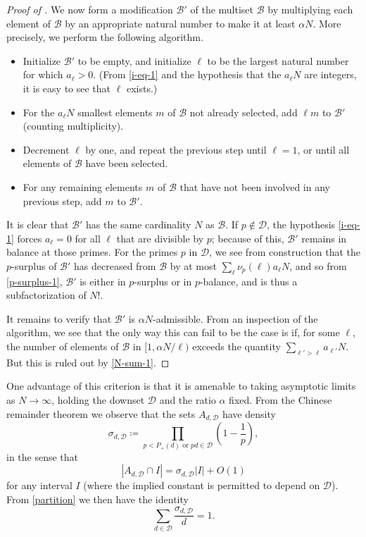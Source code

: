 \documentclass[10pt,a4paper,reqno]{amsart}
\numberwithin{equation}{section}
\theoremstyle{plain}
\theoremstyle{definition}
\newcommand\tuple{{\mathcal B}}
\begin{document}
\begin{proof}[Proof of ]
  We now form a modification $\tuple'$ of the multiset $\tuple$ by multiplying each element of $\tuple$ by an appropriate natural number to make it at least $\alpha N$.  More precisely, we perform the following algorithm.
  \begin{itemize}
    \item Initialize $\tuple'$ to be empty, and initialize $\ell$ to be the largest natural number for which $a_\ell > 0$.  (From \eqref{i-eq-1} and the hypothesis that the $a_\ell N$ are integers, it is easy to see that $\ell$ exists.)
    \item For the $a_\ell N$ smallest elements $m$ of $\tuple$ not already selected, add $\ell m$ to $\tuple'$ (counting multiplicity).
    \item Decrement $\ell$ by one, and repeat the previous step until $\ell=1$, or until all elements of $\tuple$ have been selected.
    \item For any remaining elements $m$ of $\tuple$ that have not been involved in any previous step, add $m$ to $\tuple'$.
  \end{itemize}
  It is clear that $\tuple'$ has the same cardinality $N$ as $\tuple$.  If $p \not \in {\mathcal D}$, the hypothesis \eqref{i-eq-1} forces $a_\ell=0$ for all $\ell$ that are divisible by $p$; because of this, $\tuple'$ remains in balance at those primes.  For the primes $p$ in ${\mathcal D}$, we see from construction that the $p$-surplus of $\tuple'$ has decreased from $\tuple$ by at most
  $\sum_\ell \nu_p(\ell) a_\ell N$, and so from \eqref{p-surplus-1}, $\tuple'$ is either in $p$-surplus or in $p$-balance, and is thus a subfactorization of $N!$.

It remains to verify that $\tuple'$ is $\alpha N$-admissible.  From an inspection of the algorithm, we see that the only way this can fail to be the case is if, for some $\ell$, the number of elements of $\tuple$ in $[1, \alpha N/\ell)$ exceeds the quantity $\sum_{\ell' > \ell} a_{\ell'} N$.  But this is ruled out by \eqref{N-sum-1}.
\end{proof}

One advantage of this criterion is that it is amenable to taking asymptotic limits as $N \to \infty$, holding the downset ${\mathcal D}$ and the ratio $\alpha$ fixed.  From the Chinese remainder theorem we observe that the sets $A_{d,{\mathcal D}}$ have density
$$ \sigma_{d,{\mathcal D}} \coloneqq \prod_{p < P_+(d) \text{ or } pd \in {\mathcal D}} \left(1-\frac{1}{p}\right),$$
in the sense that
\begin{equation}\label{crt}
 |A_{d,{\mathcal D}} \cap I| = \sigma_{d,{\mathcal D}} |I| + O(1)
\end{equation}
for any interval $I$ (where the implied constant is permitted to depend on ${\mathcal D}$).  From \eqref{partition} we then have the identity
\begin{equation}\label{sigma-id}
  \sum_{d \in {\mathcal D}} \frac{\sigma_{d,{\mathcal D}}}{d} = 1.
\end{equation}
\end{document}
